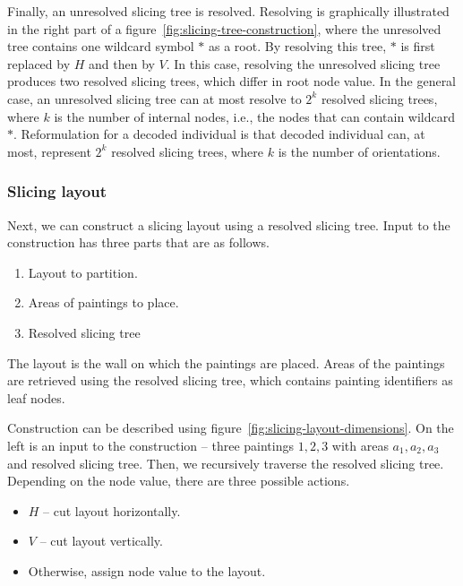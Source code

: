 Finally, an unresolved slicing tree is resolved.
Resolving is graphically illustrated in the right part of a figure~\ref{fig:slicing-tree-construction},
where the unresolved tree contains one wildcard symbol $*$ as a root.
By resolving this tree, $*$ is first replaced by $H$ and then by $V$.
In this case, resolving the unresolved slicing tree produces two resolved slicing trees,
which differ in root node value.
In the general case, an unresolved slicing tree can at most resolve to $2^k$ resolved slicing trees,
where $k$ is the number of internal nodes, i.e., the nodes that can contain wildcard $*$.
Reformulation for a decoded individual is that decoded individual can, at most, represent
$2^k$ resolved slicing trees, where $k$ is the number of orientations.



\subsubsection*{Slicing layout}

Next, we can construct a slicing layout using a resolved slicing tree.
Input to the construction has three parts that are as follows.

\begin{enumerate}
    \item Layout to partition.
    \item Areas of paintings to place.
    \item Resolved slicing tree
\end{enumerate}

The layout is the wall on which the paintings are placed.
Areas of the paintings are retrieved using the resolved slicing tree,
which contains painting identifiers as leaf nodes.

Construction can be described using figure~\ref{fig:slicing-layout-dimensions}.
On the left is an input to the construction – three paintings $1,2,3$ with areas $a_1, a_2, a_3$ and resolved slicing tree.
Then, we recursively traverse the resolved slicing tree.
Depending on the node value, there are three possible actions.

\begin{itemize}
    \item $H$ – cut layout horizontally.
    \item $V$ – cut layout vertically.
    \item Otherwise, assign node value to the layout.
\end{itemize}

